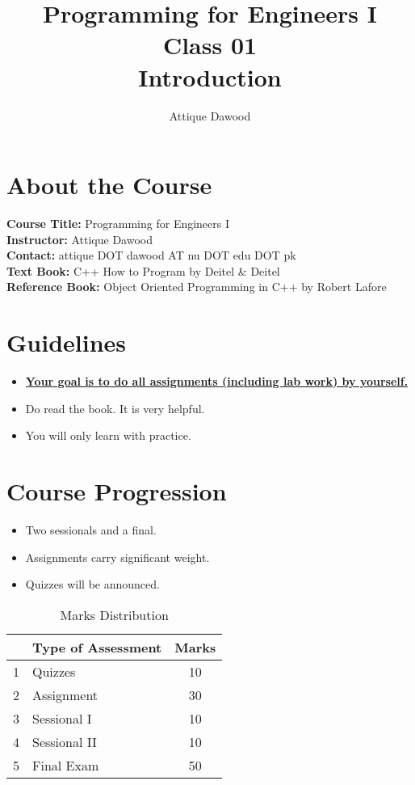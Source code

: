 \documentclass[12pt,a4paper]{article}
\title{\vspace{-2cm}Programming for Engineers I\\Class 01\\Introduction}
\author{Attique Dawood}
\begin{document}
\maketitle
\section{About the Course}
\textbf{Course Title:} Programming for Engineers I\\
\textbf{Instructor:} Attique Dawood\\
\textbf{Contact:} attique DOT dawood AT nu DOT edu DOT pk\\
\textbf{Text Book:} C++ How to Program by Deitel \& Deitel\\
\textbf{Reference Book:} Object Oriented Programming in C++ by Robert Lafore\\
\section{Guidelines}
\begin{itemize}
\item \textbf{\underline{Your goal is to do all assignments (including lab work) by yourself.}}
\item Do read the book. It is very helpful.
\item You will only learn with practice.
\end{itemize}
\section{Course Progression}
\begin{itemize}
\item Two sessionals and a final.
\item Assignments carry significant weight.
\item Quizzes will be announced.
\end{itemize}
\begin{table}[H]
\begin{center}
\vspace{0.3cm}
	\begin{tabular}{llc}
	\hline \hline
		\rule{0pt}{2.6ex} & \textbf{Type of Assessment} & \textbf{Marks}\\
		\hline
		1 \rule{0pt}{2.6ex} & Quizzes & 10\\
		2 & Assignment& 30\\
		3 & Sessional I & 10\\
		4 & Sessional II & 10\\
		5 & Final Exam & 50\\
	\hline \hline
	\end{tabular}
\end{center}
\label{Marks Distribution}
\caption{Marks Distribution}
\end{table}
\end{document}
